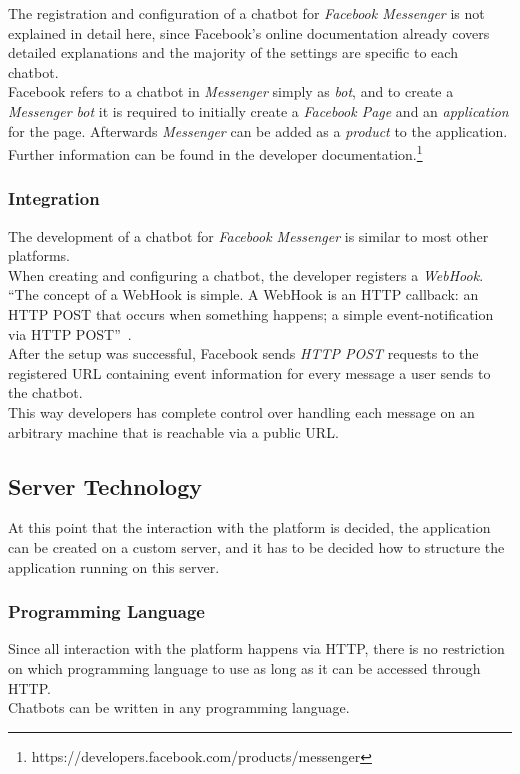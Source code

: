 The registration and configuration of a chatbot for \emph{Facebook Messenger} is not explained in detail here,
since Facebook's online documentation already covers detailed explanations
and the majority of the settings are specific to each chatbot.
\\

Facebook refers to a chatbot in \emph{Messenger} simply as \emph{bot},
and to create a \emph{Messenger bot} it is required to initially create a \emph{Facebook Page} and an \emph{application} for the page.
Afterwards \emph{Messenger} can be added as a \emph{product} to the application.
\\
Further information can be found in the developer documentation.\footnote{https://developers.facebook.com/products/messenger}

\subsubsection{Integration}

The development of a chatbot for \emph{Facebook Messenger} is similar to most other platforms.
\\
When creating and configuring a chatbot, the developer registers a \emph{WebHook}.
``The concept of a WebHook is simple. A WebHook is an HTTP callback: an HTTP POST that occurs when something happens; a simple event-notification via HTTP POST''~\cite{webhook}.
\\
After the setup was successful,
Facebook sends \emph{HTTP POST} requests to the registered URL containing event information for every message a user sends to the chatbot.
\\
This way developers has complete control over handling each message on an arbitrary machine that is reachable via a public URL.


\subsection{Server Technology}

At this point that the interaction with the platform is decided, the application can be created on a custom server,
and it has to be decided how to structure the application running on this server.


\subsubsection{Programming Language}

Since all interaction with the platform happens via HTTP,
there is no restriction on which programming language to use as long as it can be accessed through HTTP.
\\
Chatbots can be written in any programming language.
\\

